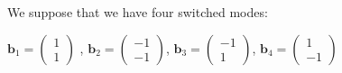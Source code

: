 % 
% 


We suppose that we have four switched modes: 

$\bm{b}_1 = \left( \begin{array}{c}1\\1\end{array} \right)$ , $\bm{b}_2 = \left( \begin{array}{c}-1\\-1\end{array} \right)$,
$\bm{b}_3 = \left( \begin{array}{c}-1\\1\end{array} \right)$, $\bm{b}_4=\left( \begin{array}{c}1\\-1\end{array} \right)$





